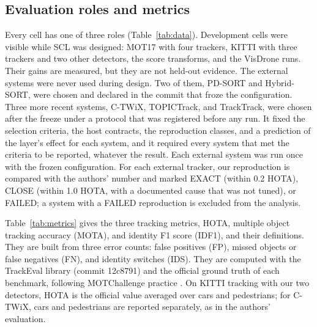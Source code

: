 \documentclass[pdflatex,sn-mathphys-num]{sn-jnl}
\newcommand{\scl}{SCL}
\begin{document}
\subsection{Evaluation roles and metrics}\label{sec:roles}
Every cell has one of three roles (Table~\ref{tab:data}). Development cells
were visible while \scl{} was designed: MOT17 with four trackers, KITTI with
three trackers and two other detectors, the score transforms, and the VisDrone
runs. Their gains are measured, but they are not held-out evidence. The
external systems were never used during design. Two of them, PD-SORT and
Hybrid-SORT, were chosen and declared in the commit that froze the
configuration. Three more recent systems, C-TWiX, TOPICTrack, and TrackTrack,
were chosen after the freeze under a protocol that was registered before any
run. It fixed the selection criteria, the host contracts, the reproduction
classes, and a prediction of the layer's effect for each system, and it
required every system that met the criteria to be reported, whatever the
result. Each external system was run once with the frozen configuration. For
each external tracker, our reproduction is compared with the authors' number
and marked EXACT (within 0.2 HOTA), CLOSE (within 1.0 HOTA, with a documented
cause that was not tuned), or FAILED; a system with a FAILED reproduction is
excluded from the analysis.

\label{sec:metrics}Table~\ref{tab:metrics} gives the three tracking metrics,
HOTA, multiple object tracking accuracy (MOTA), and identity F1 score (IDF1),
and their definitions. They are built from three error counts: false
positives (FP), missed objects or false negatives (FN), and identity switches
(IDS). They are computed with the TrackEval library (commit
12c8791) and the official ground truth of each benchmark, following
MOTChallenge practice \cite{dendorfer2021motchallenge}. On KITTI tracking
with our two detectors, HOTA is the official value averaged over cars and
pedestrians; for C-TWiX, cars and pedestrians are reported separately, as in
the authors' evaluation.
\end{document}
